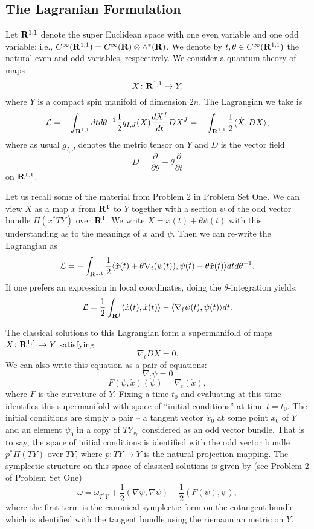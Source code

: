 \subsection{The Lagranian Formulation}

Let ${\bf R}^{1,1}$ denote the super Euclidean space with one even
variable and one odd variable; i.e., $C^\infty({\bf
R}^{1,1})=C^\infty({\bf R})\otimes \wedge^*({\bf R})$.  We denote by
$t,\theta\in C^\infty({\bf R}^{1,1})$ the natural even and odd
variables, respectively.
We consider a quantum theory of maps
$$X\colon {\bf R}^{1,1}\to Y,$$
where $Y$ is a compact spin manifold of dimension $2n$.
The Lagrangian we take is
$${\cal L}=-\int_{{\bf R}^{1,1}}dtd\theta^{-1}
\frac{1}{2}g_{I,J}(X)\frac{dX^I}{dt}DX^J=-\int_{{\bf
R}^{1,1}}\frac{1}{2}\langle \dot X,DX\rangle ,$$ 
where as usual $g_{I,J}$ denotes the metric tensor on $Y$ and $D$ is
the vector field 
$$D=\frac{\partial}{\partial\theta}-\theta\frac{\partial}{\partial
t}$$
on ${\bf R}^{1,1}$.

Let us recall some of the material from Problem 2 in Problem
Set One. 
We can view $X$ as a map $x$ from
${\bf R}^1$ to $Y$ together with a section $\psi$ of the odd vector
bundle $\Pi(x^*TY)$ over ${\bf R}^1$. 
We write $X=x(t)+\theta \psi(t)$ with this understanding as to the
meanings of $x$ and $\psi$.
Then we can re-write the
Lagrangian as
\begin{equation}\label{rewrite}
{\cal L}=
-\int_{{\bf R}^{1,1}}\frac{1}{2}\langle \dot
x(t)+\theta\nabla_t(\psi(t)) ,\psi(t)-\theta  
\dot x(t)\rangle dtd\theta^{-1}.
\end{equation}
If one prefers an expression in local coordinates,
doing the $\theta$-integration yields:
$${\cal L}=\frac{1}{2}\int_{{\bf R}^1}\langle \dot x(t) ,
\dot x(t) \rangle -\langle \nabla_t\psi(t),\psi(t)\rangle dt.$$


The classical solutions to this Lagrangian form a
supermanifold of maps $X\colon {\bf R}^{1,1}\to Y$ satisfying
$$\nabla_tDX=0.$$
We can also write this equation as a pair of equations:
$$\nabla_t\psi=0$$
$$F(\psi,\dot x)(\psi)=\nabla_t(\dot x),$$
where $F$ is the curvature of $Y$.
Fixing a time $t_0$ and evaluating at this time identifies this
supermanifold with space of ``initial conditions'' at time $t=t_0$.
The initial conditions are simply a pair -- a tangent vector $\dot x_0$
at some point $x_0$ of $Y$ and an element $\psi_0$ in a copy of
$TY_{x_0}$ considered as an odd vector bundle. That
is to say, the space of initial conditions is identified  with the odd
vector bundle 
$p^* \Pi (TY)$ over $TY$,
where $p\colon TY\to Y$ is the natural projection mapping.
The symplectic structure on this space of classical solutions is given
by (see Problem 2 of Problem Set One)
$$\omega =
\omega_{T^*Y}+\frac{1}{2}(\nabla\psi,\nabla\psi)
-\frac{1}{2}\left(F(\psi),\psi\right),$$
where the first term is the canonical symplectic form on the cotangent
bundle which is identified with the tangent bundle using the
riemannian metric on $Y$.


